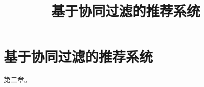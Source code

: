 \documentclass{../upctrans}
\title{基于协同过滤的推荐系统}
\begin{document}
\section{基于协同过滤的推荐系统}

第二章。
\end{document}
